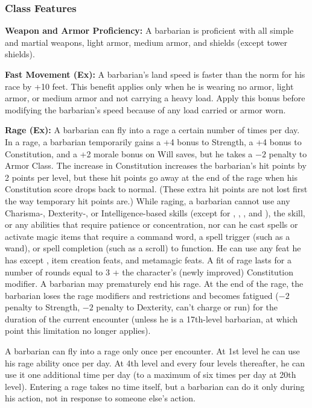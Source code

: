 \subsubsection{Class Features}

\textbf{Weapon and Armor Proficiency:} A barbarian is proficient with all simple and martial weapons, light armor, medium armor, and shields (except tower shields).

\textbf{Fast Movement (Ex):} A barbarian's land speed is faster than the norm for his race by +10 feet. This benefit applies only when he is wearing no armor, light armor, or medium armor and not carrying a heavy load. Apply this bonus before modifying the barbarian's speed because of any load carried or armor worn.

\textbf{Rage (Ex):} A barbarian can fly into a rage a certain number of times per day. In a rage, a barbarian temporarily gains a +4 bonus to Strength, a +4 bonus to Constitution, and a +2 morale bonus on Will saves, but he takes a $-2$ penalty to Armor Class. The increase in Constitution increases the barbarian's hit points by 2 points per level, but these hit points go away at the end of the rage when his Constitution  score drops back to normal. (These extra hit points are not lost first the way temporary hit points are.) While raging, a barbarian cannot use any Charisma-, Dexterity-, or Intelligence-based skills (except for , , , and ), the  skill, or any abilities that require patience or concentration, nor can he cast spells or activate magic items that require a command word, a spell trigger (such as a wand), or spell completion (such as a scroll) to function. He can use any feat he has except , item creation feats, and metamagic feats. A fit of rage lasts for a number of rounds equal to 3 + the character's (newly improved) Constitution modifier. A barbarian may prematurely end his rage. At the end of the rage, the barbarian loses the rage modifiers and restrictions and becomes fatigued ($-2$ penalty to Strength, $-2$ penalty to Dexterity, can't charge or run) for the duration of the current encounter (unless he is a 17th-level barbarian, at which point this limitation no longer applies).

A barbarian can fly into a rage only once per encounter. At 1st level he can use his rage ability once per day. At 4th level and every four levels thereafter, he can use it one additional time per day (to a maximum of six times per day at 20th level). Entering a rage takes no time itself, but a barbarian can do it only during his action, not in response to someone else's action. 

